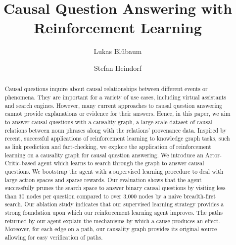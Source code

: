\title{Causal Question Answering with Reinforcement Learning}

\author{Lukas Blübaum}
\author{Stefan Heindorf}

\begin{abstract}
Causal questions inquire about causal relationships between different events or phenomena. They are important for a variety of use cases, including virtual assistants and search engines. However, many current approaches to causal question answering cannot provide explanations or evidence for their answers. Hence, in this paper, we aim to answer causal questions with a causality graph, a large-scale dataset of causal relations between noun phrases along with the relations' provenance data. Inspired by recent, successful applications of reinforcement learning to knowledge graph tasks, such as link prediction and fact-checking, we explore the application of reinforcement learning on a causality graph for causal question answering. We introduce an Actor-Critic-based agent which learns to search through the graph to answer causal questions. We bootstrap the agent with a supervised learning procedure to deal with large action spaces and sparse rewards. Our evaluation shows that the agent successfully prunes the search space to answer binary causal questions by visiting less than 30 nodes per question compared to over 3,000 nodes by a naive breadth-first search. Our ablation study indicates that our supervised learning strategy provides a strong foundation upon which our reinforcement learning agent improves. The paths returned by our agent explain the mechanisms by which a cause produces an effect. Moreover, for each edge on a path, our causality graph provides its original source allowing for easy verification of paths.
\end{abstract}

